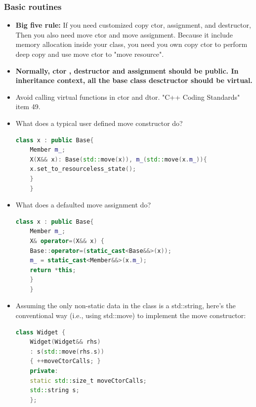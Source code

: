 \documentclass[a4paper,12pt,twoside]{book}
\begin{document}
\subsubsection{Basic routines}
\begin{itemize}
	\item \textbf{Big five rule:} If you need customized copy ctor, assignment, and destructor, Then you also need move ctor and move assignment. Because it include memory allocation inside your class, you need you own copy ctor to perform deep copy and use move ctor to "move resource".
	
	\item \textbf{Normally, ctor , destructor and assignment should be public. In inheritance context, all the base class desctructor should be virtual. }
	
	\item Avoid calling virtual functions in ctor and dtor. "C++ Coding Standards" item 49.
	
	\item What does a typical user defined move constructor do?
	\begin{lstlisting}[frame=single, language=c++]
	class x : public Base{
	Member m_;
	X(X&& x): Base(std::move(x)), m_(std::move(x.m_)){
	x.set_to_resourceless_state();
	}
	}
	\end{lstlisting}
	
	\item What does a defaulted move assignment do?
	\begin{lstlisting}[frame=single, language=c++]
	class x : public Base{
	Member m_;
	X& operator=(X&& x) {
	Base::operator=(static_cast<Base&&>(x));
	m_ = static_cast<Member&&>(x.m_);
	return *this;
	}
	}
	\end{lstlisting}
	
	
	
	\item Assuming the only non-static data in the class is a std::string, here's the conventional way (i.e., using std::move) to implement the move constructor:
	\begin{lstlisting}[frame=single, language=c++]
	class Widget {
	Widget(Widget&& rhs)
	: s(std::move(rhs.s))
	{ ++moveCtorCalls; }
	private:
	static std::size_t moveCtorCalls;
	std::string s;
	};
	\end{lstlisting}
	

\end{itemize}
\end{document}
